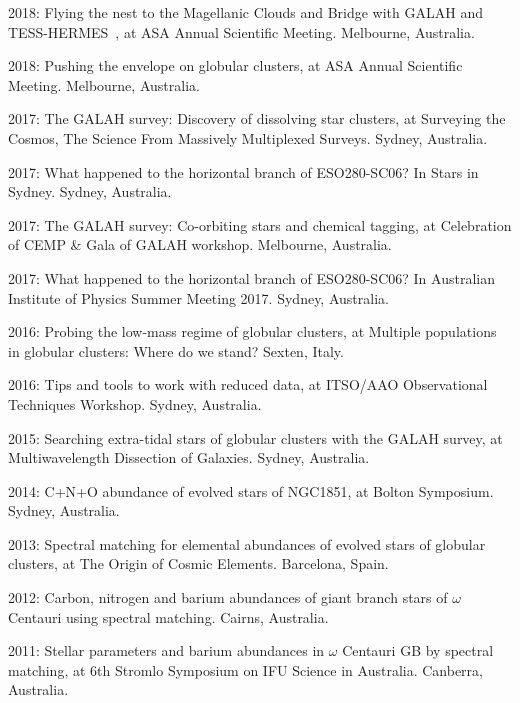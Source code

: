 \item[{\color{numcolor}\scriptsize13}] 2018: Flying the nest to the Magellanic Clouds and Bridge with GALAH and TESS-HERMES~, at  ASA Annual Scientific Meeting. Melbourne, Australia.
\item[{\color{numcolor}\scriptsize12}] 2018: Pushing the envelope on globular clusters, at  ASA Annual Scientific Meeting. Melbourne, Australia.
\item[{\color{numcolor}\scriptsize11}] 2017: The GALAH survey: Discovery of dissolving star clusters, at  Surveying the Cosmos, The Science From Massively Multiplexed Surveys. Sydney, Australia.
\item[{\color{numcolor}\scriptsize10}] 2017: What happened to the horizontal branch of ESO280-SC06? In Stars in Sydney. Sydney, Australia.
\item[{\color{numcolor}\scriptsize9}] 2017: The GALAH survey: Co-orbiting stars and chemical tagging, at  Celebration of CEMP \& Gala of GALAH workshop. Melbourne, Australia.
\item[{\color{numcolor}\scriptsize8}] 2017: What happened to the horizontal branch of ESO280-SC06? In Australian Institute of Physics Summer Meeting 2017. Sydney, Australia.
\item[{\color{numcolor}\scriptsize7}] 2016: Probing the low-mass regime of globular clusters, at  Multiple populations in globular clusters: Where do we stand? Sexten, Italy.
\item[{\color{numcolor}\scriptsize6}] 2016: Tips and tools to work with reduced data, at  ITSO/AAO Observational Techniques Workshop. Sydney, Australia.
\item[{\color{numcolor}\scriptsize5}] 2015: Searching extra-tidal stars of globular clusters with the GALAH survey, at  Multiwavelength Dissection of Galaxies. Sydney, Australia.
\item[{\color{numcolor}\scriptsize4}] 2014: C+N+O abundance of evolved stars of NGC1851, at  Bolton Symposium. Sydney, Australia.
\item[{\color{numcolor}\scriptsize3}] 2013: Spectral matching for elemental abundances of evolved stars of globular clusters, at  The Origin of Cosmic Elements. Barcelona, Spain.
\item[{\color{numcolor}\scriptsize2}] 2012: Carbon, nitrogen and barium abundances of giant branch stars of $\omega$ Centauri using spectral matching. Cairns, Australia.
\item[{\color{numcolor}\scriptsize1}] 2011: Stellar parameters and barium abundances in $\omega$ Centauri GB by spectral matching, at  6th Stromlo Symposium on IFU Science in Australia. Canberra, Australia.
